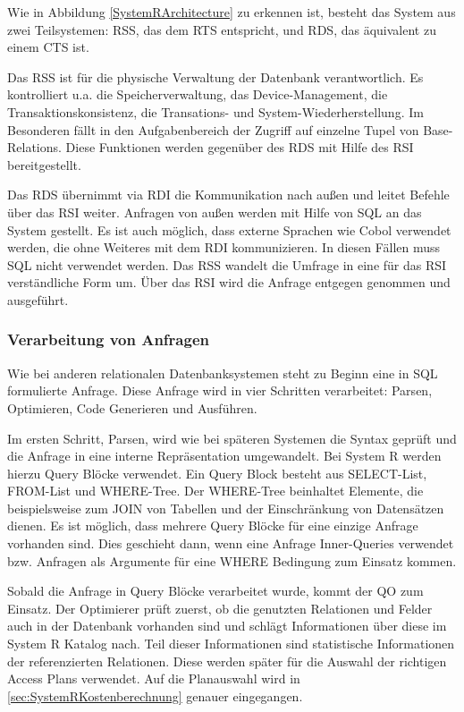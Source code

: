 Wie in Abbildung \ref{SystemRArchitecture} zu erkennen ist,  besteht das System aus zwei Teilsystemen: \ac{RSS}, das dem RTS entspricht, und \ac{RDS}, das äquivalent zu einem CTS ist.

Das \ac{RSS} ist für die physische Verwaltung der Datenbank verantwortlich. Es kontrolliert u.a. die Speicherverwaltung, das Device-Management, die Transaktionskonsistenz, die Transations- und System-Wiederherstellung. Im Besonderen fällt in den Aufgabenbereich der Zugriff auf einzelne Tupel von Base-Relations. Diese Funktionen werden gegenüber des \ac{RDS} mit Hilfe des \ac{RSI} bereitgestellt.

Das \ac{RDS} übernimmt via \ac{RDI} die Kommunikation nach außen und leitet Befehle über das \ac{RSI} weiter. Anfragen von außen werden mit Hilfe von \ac{SQL} an das System gestellt. Es ist auch möglich, dass externe Sprachen wie Cobol verwendet werden, die ohne Weiteres mit dem \ac{RDI} kommunizieren. In diesen Fällen muss SQL nicht verwendet werden. Das \ac{RSS} wandelt die Umfrage in eine für das \ac{RSI} verständliche Form um. Über das RSI wird die Anfrage entgegen genommen und ausgeführt.




\subsubsection{Verarbeitung von Anfragen}

Wie bei anderen relationalen Datenbanksystemen steht zu  Beginn eine in \ac{SQL} formulierte Anfrage. Diese Anfrage wird in vier Schritten verarbeitet: Parsen,  Optimieren, Code Generieren und Ausführen.

Im ersten Schritt, Parsen, wird wie bei späteren Systemen die Syntax geprüft und die Anfrage in eine interne Repräsentation umgewandelt. Bei System R werden hierzu Query Blöcke verwendet. Ein Query Block besteht aus SELECT-List, FROM-List und WHERE-Tree. Der WHERE-Tree beinhaltet Elemente, die beispielsweise zum JOIN von Tabellen und der Einschränkung von Datensätzen dienen. Es ist möglich, dass mehrere Query Blöcke für eine einzige Anfrage vorhanden sind. Dies geschieht dann, wenn eine Anfrage Inner-Queries verwendet bzw. Anfragen als Argumente für eine WHERE Bedingung zum Einsatz kommen.


Sobald die Anfrage in Query Blöcke verarbeitet wurde, kommt der \ac{QO} zum Einsatz. Der Optimierer prüft zuerst, ob die genutzten Relationen und Felder auch in der Datenbank vorhanden sind und schlägt Informationen über diese im System R Katalog nach. Teil dieser Informationen sind statistische Informationen der referenzierten Relationen. Diese werden später für die Auswahl der richtigen Access Plans verwendet. Auf die Planauswahl wird in \ref{sec:SystemRKostenberechnung} genauer eingegangen.

